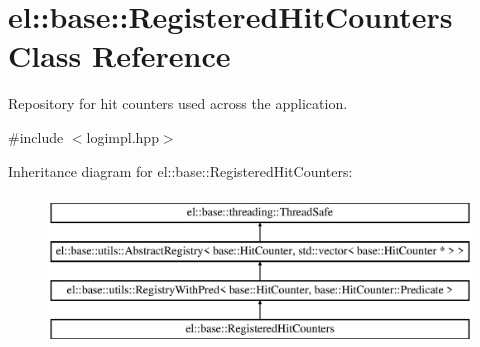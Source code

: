\hypertarget{classel_1_1base_1_1RegisteredHitCounters}{\section{el\-:\-:base\-:\-:Registered\-Hit\-Counters Class Reference}
\label{classel_1_1base_1_1RegisteredHitCounters}
}


Repository for hit counters used across the application.  




{\ttfamily \#include $<$logimpl.\-hpp$>$}

Inheritance diagram for el\-:\-:base\-:\-:Registered\-Hit\-Counters\-:\begin{figure}[H]
\begin{center}
\leavevmode
\includegraphics[height=4.000000cm]{classel_1_1base_1_1RegisteredHitCounters}
\end{center}
\end{figure}
